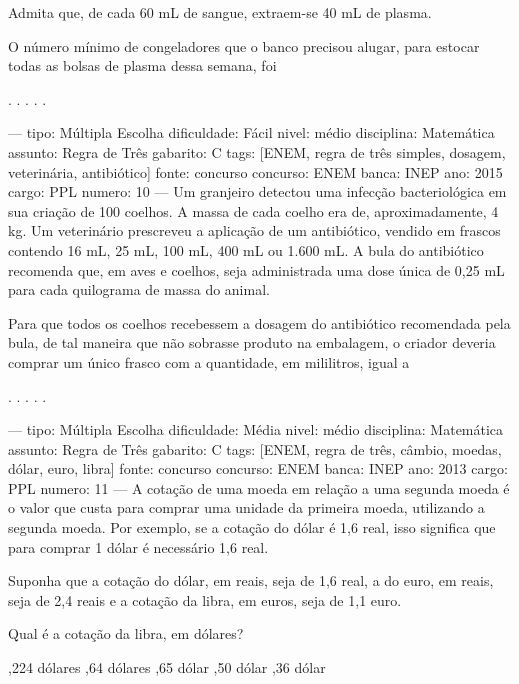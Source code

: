 Admita que, de cada 60 mL de sangue, extraem-se 40 mL de plasma.

O número mínimo de congeladores que o banco precisou alugar, para estocar todas as bolsas de plasma dessa semana, foi
\begin{choices}
.
.
.
.
.
\end{choices}

---
tipo: Múltipla Escolha
dificuldade: Fácil
nivel: médio
disciplina: Matemática
assunto: Regra de Três
gabarito: C
tags: [ENEM, regra de três simples, dosagem, veterinária, antibiótico]
fonte: concurso
concurso: ENEM
banca: INEP
ano: 2015
cargo: PPL
numero: 10
---
\question
Um granjeiro detectou uma infecção bacteriológica em sua criação de 100 coelhos. A massa de cada coelho era de, aproximadamente, 4 kg. Um veterinário prescreveu a aplicação de um antibiótico, vendido em frascos contendo 16 mL, 25 mL, 100 mL, 400 mL ou 1.600 mL. A bula do antibiótico recomenda que, em aves e coelhos, seja administrada uma dose única de 0,25 mL para cada quilograma de massa do animal.

Para que todos os coelhos recebessem a dosagem do antibiótico recomendada pela bula, de tal maneira que não sobrasse produto na embalagem, o criador deveria comprar um único frasco com a quantidade, em mililitros, igual a
\begin{choices}
.
.
.
.
.
\end{choices}

---
tipo: Múltipla Escolha
dificuldade: Média
nivel: médio
disciplina: Matemática
assunto: Regra de Três
gabarito: C
tags: [ENEM, regra de três, câmbio, moedas, dólar, euro, libra]
fonte: concurso
concurso: ENEM
banca: INEP
ano: 2013
cargo: PPL
numero: 11
---
\question
A cotação de uma moeda em relação a uma segunda moeda é o valor que custa para comprar uma unidade da primeira moeda, utilizando a segunda moeda. Por exemplo, se a cotação do dólar é 1,6 real, isso significa que para comprar 1 dólar é necessário 1,6 real.

Suponha que a cotação do dólar, em reais, seja de 1,6 real, a do euro, em reais, seja de 2,4 reais e a cotação da libra, em euros, seja de 1,1 euro.

Qual é a cotação da libra, em dólares?
\begin{choices}
,224 dólares
,64 dólares
,65 dólar
,50 dólar
,36 dólar
\end{choices}


